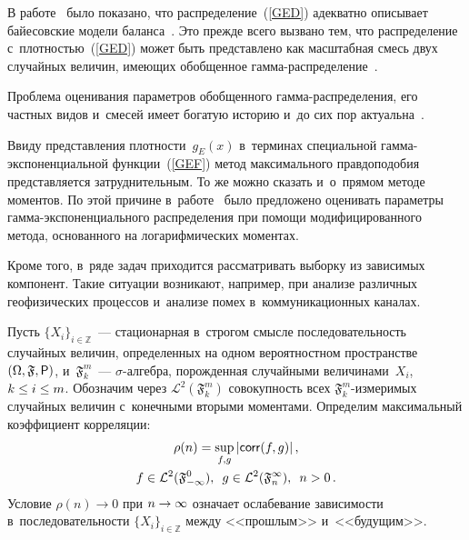 \begin{multicols}{2}
\vspace*{-3pt}

В работе~\cite{Ku2019_2} было показано, что рас\-пре\-де\-ле\-ние~(\ref{GED}) адекватно 
описывает байесовские модели ба\-лан\-са~\cite{Ku2018}. Это преж\-де всего вызвано 
тем, что распределение с~плот\-ностью~(\ref{GED}) может быть пред\-став\-ле\-но
 как мас\-штаб\-ная смесь двух случайных ве\-ли\-чин, име\-ющих обобщенное 
гам\-ма-рас\-пре\-де\-ле\-ние~\cite{Ku2019_2}.

Проблема оценивания па\-ра\-мет\-ров обобщенного гамма-рас\-пре\-де\-ле\-ния, его част\-ных 
видов и~смесей имеет богатую историю и~до сих пор актуальна~\cite{IrVaGoGo2020,RiBaGaGo2020,CoNg2021,SaGoBaGo2022}.

Ввиду представления плот\-ности~$g_E(x)$ в~терминах специальной гам\-ма-экс\-по\-нен\-ци\-аль\-ной функции~(\ref{GEF})
 метод максимального прав\-до\-по\-до\-бия 
пред\-став\-ля\-ет\-ся за\-труд\-ни\-тель\-ным. То же мож\-но сказать и~о~прямом методе моментов. 
По этой причине в~работе~\cite{KuShe2020} было предложено оценивать па\-ра\-мет\-ры 
гам\-ма-экс\-по\-нен\-ци\-аль\-но\-го рас\-пре\-де\-ле\-ния при помощи модифицированного метода, 
осно\-ван\-но\-го на логарифмических моментах.

\pagebreak

Кроме того, в~ряде задач приходится рас\-смат\-ри\-вать выборку из зависимых 
компонент. Такие ситуации воз\-ни\-ка\-ют, например, при анализе раз\-лич\-ных 
геофизических процессов и~анализе помех в~коммуникационных каналах.

Пусть $\{X_i\}_{i\in\mathbb{Z}}$~--- стационарная в~строгом смыс\-ле 
по\-сле\-до\-ва\-тель\-ность случайных величин, определенных на одном вероятностном 
про\-стран\-ст\-ве~$(\Omega, \mathfrak{F}, {\sf P})$, и~$\mathfrak{F}_k^m$~--- $\sigma$-ал\-геб\-ра, 
по\-рож\-ден\-ная \mbox{случай\-ны\-ми} величинами~$X_i$, $k\hm\leq i\hm\leq m$. Обозначим 
через ${\mathcal{L}}^2(\mathfrak{F}_k^m)$ со\-во\-куп\-ность всех $\mathfrak{F}_k^m$-из\-ме\-ри\-мых 
случайных величин с~конечными вторыми моментами. Определим 
максимальный коэффициент кор\-ре\-ляции:
\begin{multline*}
\label{corr}
\rho(n)=\sup\limits_{f,g}\left\vert{\sf corr}(f,g)\right\vert,\\
 f\in {\cal{L}}^2(\mathfrak{F}_{-\infty}^0),\enskip g\in {\cal{L}}^2(\mathfrak{F}_n^{\infty}), \enskip  n>0\,.
\end{multline*}
Условие $\rho(n)\longrightarrow0$ при $n\hm\to\infty$ означает ослабевание 
зависимости в~по\-сле\-до\-ва\-тель\-ности $\{X_i\}_{i\in\mathbb{Z}}$ между <<прош\-лым>> 
и~<<будущим>>.


\end{multicols}
